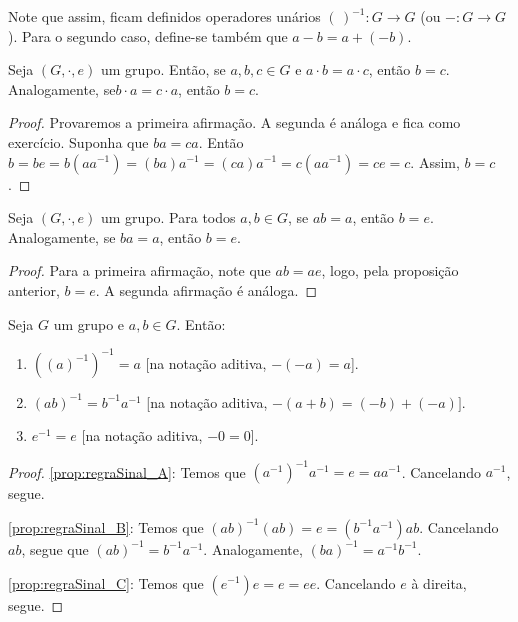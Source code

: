 Note que assim, ficam definidos operadores unários $(\,)^{-1}:G\rightarrow G$ (ou $-:G\rightarrow G$). Para o segundo caso, define-se também que $a-b=a+(-b)$.

\begin{prop}[Cancelamento]
    Seja $(G,\cdot,e)$ um grupo. Então, se $a,b,c \in G$ e $a \cdot b = a \cdot c$, então $b=c$. Analogamente, se$b \cdot a = c \cdot a$, então $b=c$.
\end{prop}
\begin{proof}
Provaremos a primeira afirmação. A segunda é análoga e fica como exercício.
    Suponha que $ba=ca$. Então $b=be=b(aa^{-1})=(ba)a^{-1}=(ca)a^{-1}=c(aa^{-1})=ce=c$. Assim, $b=c$.
\end{proof}

\begin{corol}[Cancelamento II]
    Seja $(G,\cdot,e)$ um grupo. Para todos $a, b \in G$, se $ab=a$, então $b=e$. Analogamente, se $ba=a$, então $b=e$.
\end{corol}
\begin{proof}
    Para a primeira afirmação, note que $ab=ae$, logo, pela proposição anterior, $b=e$. A segunda afirmação é análoga.
\end{proof}

\begin{prop}\label{prop:regraSinal}
    Seja $G$ um grupo e $a, b \in G$. Então:
    \begin{enumerate}[label=\alph*)]
        \item $((a)^{-1})^{-1}=a$ [na notação aditiva, $-(-a)=a$]. \label{prop:regraSinal_A}
        \item $(ab)^{-1}=b^{-1}a^{-1}$ [na notação aditiva, $-(a+b)=(-b)+(-a)]$.\label{prop:regraSinal_B}
        \item $e^{-1}=e$ [na notação aditiva, $-0=0$].\label{prop:regraSinal_C}
    \end{enumerate}
\end{prop}
\begin{proof}
    \ref{prop:regraSinal_A}: Temos que $(a^{-1})^{-1}a^{-1}=e=aa^{-1}$. Cancelando $a^{-1}$, segue.
    
    \ref{prop:regraSinal_B}: Temos que $(ab)^{-1}(ab)=e=(b^{-1}a^{-1})ab$. Cancelando $ab$, segue que $(ab)^{-1}=b^{-1}a^{-1}$. Analogamente, $(ba)^{-1}=a^{-1}b^{-1}$.

    \ref{prop:regraSinal_C}: Temos que $(e^{-1})e=e=ee$. Cancelando $e$ à direita, segue.


\end{proof}

